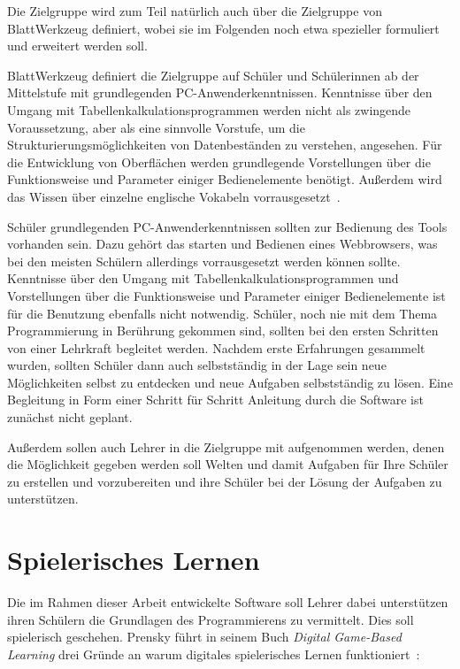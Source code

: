Die Zielgruppe wird zum Teil natürlich auch über die Zielgruppe von BlattWerkzeug definiert, wobei sie im Folgenden noch etwa spezieller formuliert und erweitert werden soll.

BlattWerkzeug definiert die Zielgruppe auf Schüler und Schülerinnen ab der Mittelstufe mit grundlegenden PC-Anwenderkenntnissen. Kenntnisse über den Umgang mit Tabellenkalkulationsprogrammen werden nicht als zwingende Voraussetzung, aber als eine sinnvolle Vorstufe, um die Strukturierungsmöglichkeiten von Datenbeständen zu verstehen, angesehen. Für die Entwicklung von Oberflächen werden grundlegende Vorstellungen über die Funktionsweise und Parameter einiger Bedienelemente benötigt. Außerdem wird das Wissen über einzelne englische Vokabeln vorrausgesetzt~\cite[22-23]{riemer2016}.

Schüler grundlegenden PC-Anwenderkenntnissen sollten zur Bedienung des Tools vorhanden sein. Dazu gehört das starten und Bedienen eines Webbrowsers, was bei den meisten Schülern allerdings vorrausgesetzt werden können sollte. Kenntnisse über den Umgang mit Tabellenkalkulationsprogrammen und Vorstellungen über die Funktionsweise und Parameter einiger Bedienelemente ist für die Benutzung ebenfalls nicht notwendig. Schüler, noch nie mit dem Thema Programmierung in Berührung gekommen sind, sollten bei den ersten Schritten von einer Lehrkraft begleitet werden. Nachdem erste Erfahrungen gesammelt wurden, sollten Schüler dann auch selbstständig in der Lage sein neue Möglichkeiten selbst zu entdecken und neue Aufgaben selbstständig zu lösen. Eine Begleitung in Form einer Schritt für Schritt Anleitung durch die Software ist zunächst nicht geplant.

Außerdem sollen auch Lehrer in die Zielgruppe mit aufgenommen werden, denen die Möglichkeit gegeben werden soll Welten und damit Aufgaben für Ihre Schüler zu erstellen und vorzubereiten  und ihre Schüler bei der Lösung der Aufgaben zu unterstützen.


\section{Spielerisches Lernen}

Die im Rahmen dieser Arbeit entwickelte Software soll Lehrer dabei unterstützen ihren Schülern die Grundlagen des Programmierens zu vermittelt. Dies soll spielerisch geschehen. Prensky führt in seinem Buch \textit{Digital Game-Based Learning} drei Gründe an warum digitales spielerisches Lernen funktioniert~\cite[147]{prensky2007}:

